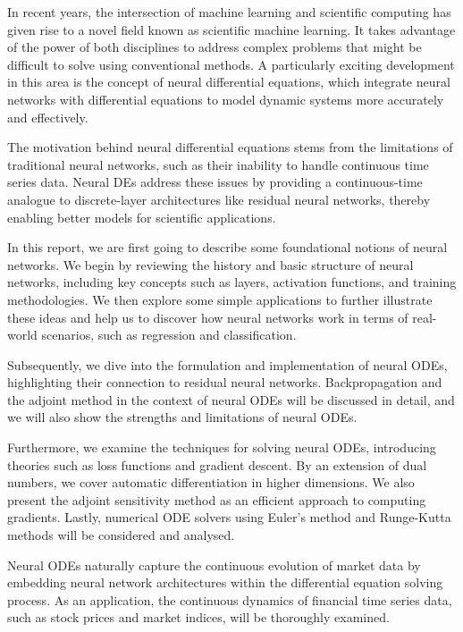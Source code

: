 \documentclass[a4paper,11pt,titlepage]{article}
\theoremstyle{definition}
\theoremstyle{plain}
\theoremstyle{remark}
\begin{document}
In recent years, the intersection of machine learning and scientific computing has given rise to a novel field known as scientific machine learning. It takes advantage of the power of both disciplines to address complex problems that might be difficult to solve using conventional methods. A particularly exciting development in this area is the concept of neural differential equations, which integrate neural networks with differential equations to model dynamic systems more accurately and effectively.

The motivation behind neural differential equations stems from the limitations of traditional neural networks, such as their inability to handle continuous time series data. Neural DEs address these issues by providing a continuous-time analogue to discrete-layer architectures like residual neural networks, thereby enabling better models for scientific applications.

In this report, we are first going to describe some foundational notions of neural networks. We begin by reviewing the history and basic structure of neural networks, including key concepts such as layers, activation functions, and training methodologies. We then explore some simple applications to further illustrate these ideas and help us to discover how neural networks work in terms of real-world scenarios, such as regression and classification.

Subsequently, we dive into the formulation and implementation of neural ODEs, highlighting their connection to residual neural networks. Backpropagation and the adjoint method in the context of neural ODEs will be discussed in detail, and we will also show the strengths and limitations of neural ODEs.

Furthermore, we examine the techniques for solving neural ODEs, introducing theories such as loss functions and gradient descent. By an extension of dual numbers, we cover automatic differentiation in higher dimensions. We also present the adjoint sensitivity method as an efficient approach to computing gradients. Lastly, numerical ODE solvers using Euler's method and Runge-Kutta methods will be considered and analysed.

Neural ODEs naturally capture the continuous evolution of market data by embedding neural network architectures within the differential equation solving process. As an application, the continuous dynamics of financial time series data, such as stock prices and market indices, will be thoroughly examined.
\end{document}
